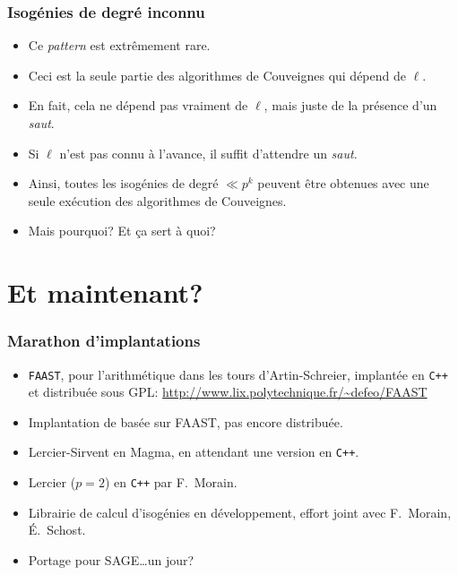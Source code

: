 \documentclass[10pt]{beamer}
\newcommand{\0}{\mathcal{O}}  %
\begin{document}
\begin{frame}
  \frametitle{Isogénies de degré inconnu}
  
  \begin{itemize}
  \item Ce \emph{pattern} est extrêmement rare.
  \item Ceci est la seule partie des algorithmes de Couveignes qui dépend de $\ell$.
  \item<2-> \large En fait, cela ne dépend pas vraiment de $\ell$, mais juste de
    la présence d'un \emph{saut}.
  \item<2-> \large Si $\ell$ n'est pas connu à l'avance, il suffit d'attendre
    un \emph{saut}.
  \item<2-> \large Ainsi, toutes les isogénies de degré $\ll p^k$ peuvent être
    obtenues avec une seule exécution des algorithmes de Couveignes.
  \item<3-> \Large Mais pourquoi? Et ça sert à quoi?
  \end{itemize}  
\end{frame}


\section{Et maintenant?}

\begin{frame}
  \frametitle{Marathon d'implantations}

  \begin{itemize}
  \item \texttt{FAAST}, pour l'arithmétique dans les tours
    d'Artin-Schreier, implantée en \texttt{C++} et distribuée sous
    GPL: \url{http://www.lix.polytechnique.fr/~defeo/FAAST}
  \item Implantation de \cite{couveignes96} basée sur FAAST, pas encore distribuée.
  \item Lercier-Sirvent en Magma, en attendant une version en \texttt{C++}.
  \item Lercier ($p=2$) en \texttt{C++} par F.~Morain.
  \item Librairie de calcul d'isogénies en développement, effort joint
    avec F.~Morain, É.~Schost.
  \item Portage pour SAGE\dots un jour?
  \end{itemize}
\end{frame}

\end{document}
